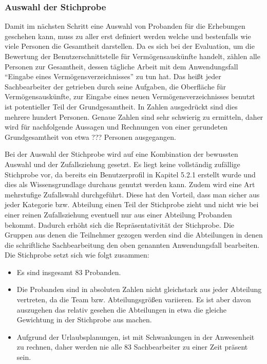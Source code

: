 
\subsubsection{Auswahl der Stichprobe}
Damit im nächsten Schritt eine Auswahl von Probanden für die Erhebungen geschehen kann, muss zu aller erst definiert werden welche und bestenfalls wie viele Personen die Gesamtheit darstellen. Da es sich bei der Evaluation, um die Bewertung der Benutzerschnittstelle für Vermögensauskünfte handelt, zählen alle Personen zur Gesamtheit, dessen tägliche Arbeit mit dem Anwendungsfall \enquote{Eingabe eines Vermögensverzeichnisses} zu tun hat. Das heißt jeder Sachbearbeiter der getrieben durch seine Aufgaben, die Oberfläche für Vermögensauskünfte, zur Eingabe eines neuen Vermögensverzeichnisses benutzt ist potentieller Teil der Grundgesamtheit. In Zahlen ausgedrückt sind dies mehrere hundert Personen. Genaue Zahlen sind sehr schwierig zu ermitteln, daher wird für nachfolgende Aussagen und Rechnungen von einer gerundeten Grundgesamtheit von etwa ??? Personen ausgegangen.

Bei der Auswahl der Stichprobe wird auf eine Kombination der bewussten Auswahl und der Zufallsziehung gesetzt. Es liegt keine vollständig zufällige Stichprobe vor, da bereits ein Benutzerprofil in Kapitel 5.2.1 erstellt wurde und dies als Wissensgrundlage durchaus genutzt werden kann. Zudem wird eine Art mehrstufige Zufallswahl durchgeführt. Diese hat den Vorteil, dass man sicher aus jeder Kategorie bzw. Abteilung einen Teil der Stichprobe zieht und nicht wie bei einer reinen Zufallsziehung eventuell nur aus einer Abteilung Probanden bekommt. Dadurch erhöht sich die Repräsentativität der Stichprobe. Die Gruppen aus denen die Teilnehmer gezogen werden sind die Abteilungen in denen die schriftliche Sachbearbeitung den oben genannten Anwendungsfall bearbeiten. Die Stichprobe setzt sich wie folgt zusammen:
\begin{itemize}
    \item Es sind insgesamt 83 Probanden.
    \item Die Probanden sind in absoluten Zahlen nicht gleichstark aus jeder Abteilung vertreten, da die Team bzw. Abteilungsgrößen variieren. Es ist aber davon auszugehen das relativ gesehen die Abteilungen in etwa die gleiche Gewichtung in der Stichprobe aus machen.
    \item Aufgrund der Urlaubsplanungen, ist mit Schwankungen in der Anwesenheit zu rechnen, daher werden nie alle 83 Sachbearbeiter zu einer Zeit präsent sein.
\end{itemize}

